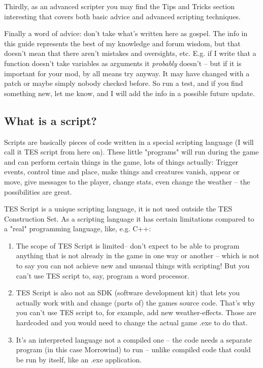 \documentclass[oneside]{article}
\begin{document}
Thirdly, as an advanced scripter you may find the Tips and Tricks section interesting that covers both basic advice and advanced scripting techniques.

Finally a word of advice: don't take what's written here as gospel. The info in this guide represents the best of my knowledge and forum wisdom, but that doesn't mean that there aren't mistakes and oversights, etc. E.g. if I write that a function doesn't take variables as arguments it \emph{probably} doesn't -- but if it is important for your mod, by all means try anyway. It may have changed with a patch or maybe simply nobody checked before. So run a test, and if you find something new, let me know, and I will add the info in a possible future update.

\hypertarget{what-is-a-script}{%
\subsection{What is a script?}\label{what-is-a-script}}

Scripts are basically pieces of code written in a special scripting language (I will call it TES script from here on). These little "programs" will run during the game and can perform certain things in the game, lots of things actually: Trigger events, control time and place, make things and creatures vanish, appear or move, give messages to the player, change stats, even change the weather -- the possibilities are great.

TES Script is a unique scripting language, it is not used outside the TES Construction Set. As a scripting language it has certain limitations compared to a "real" programming language, like, e.g. C++:

\begin{enumerate}
\def\labelenumi{\arabic{enumi}.}
\item
  The scope of TES Script is limited-- don't expect to be able to program anything that is not already in the game in one way or another -- which is not to say you can not achieve new and unusual things with scripting! But you can't use TES script to, say, program a word processor.
\item
  TES Script is also not an SDK (software development kit) that lets you actually work with and change (parts of) the games source code. That's why you can't use TES script to, for example, add new weather-effects. Those are hardcoded and you would need to change the actual game .exe to do that.
\item
  It's an interpreted language not a compiled one -- the code needs a separate program (in this case Morrowind) to run -- unlike compiled code that could be run by itself, like an .exe application.
\end{enumerate}
\end{document}
